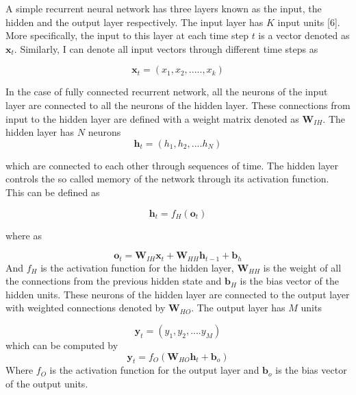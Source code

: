 A simple recurrent neural network has three layers known as the input, the hidden and the output layer respectively. The input layer has $K$ input units [6]. More specifically, the input to this layer at each time step $t$ is a vector denoted as $\textbf{x}_t$. Similarly, I can denote all input vectors through different time steps as

\begin{equation}
\textbf{x}_t = ({x}_1,{x}_2,.....,{x}_k)
\end{equation}

In the case of fully connected recurrent network, all the neurons of the input layer are connected to all the neurons of the hidden layer. These connections from input to the hidden layer are defined with a weight matrix denoted as $\textbf {W}_{IH}$. The hidden layer has $N$ neurons
\begin{equation}
\textbf{h}_t = (h_1,h_2,....h_N)
\end{equation} 

which are connected to each other through sequences of time. The hidden layer controls the so called memory of the network through its activation function. This can be defined as

\begin{equation}
\textbf{h}_t = f_H(\textbf{o}_t)
\end{equation}

where as

\begin{equation}
\textbf{o}_t = \textbf{W}_{IH}\textbf{x}_{t}+\textbf{W}_{HH}\textbf{h}_{t-1}+\textbf{b}_{h}
\end{equation}
And $f_{H}$ is the activation function for the hidden layer, $\textbf {W}_{HH}$ is the weight of all the connections from the previous hidden state and $\textbf {b}_{H}$ is the bias vector of the hidden units. These neurons of the hidden layer are connected to the output layer with weighted connections denoted by 
$\textbf {W}_{HO}$. The output layer has $M$ units
 
\begin{equation}
\textbf{y}_t = (y_1,y_2,....y_M)
\end{equation}
which can be computed by
\begin{equation}
\textbf{y}_t= f_O(\textbf{W}_{HO}\textbf{h}_{t}+\textbf{b}_{o})
\end{equation} 
Where $f_{O}$ is the activation function for the output layer and $\textbf {b}_{o}$ is the bias vector of the output units.


